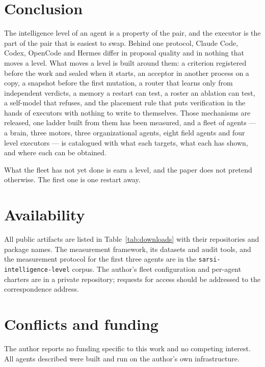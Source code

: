 \documentclass[11pt]{article}
\theoremstyle{definition}
\begin{document}
\section{Conclusion}\label{sec:conclusion}

The intelligence level of an agent is a property of the pair, and the executor is the part of the pair that is easiest to swap. Behind one protocol, Claude Code, Codex, OpenCode and Hermes differ in proposal quality and in nothing that moves a level. What moves a level is built around them: a criterion registered before the work and sealed when it starts, an acceptor in another process on a copy, a snapshot before the first mutation, a router that learns only from independent verdicts, a memory a restart can test, a roster an ablation can test, a self-model that refuses, and the placement rule that puts verification in the hands of executors with nothing to write to themselves. Those mechanisms are released, one ladder built from them has been measured, and a fleet of agents --- a brain, three motors, three organizational agents, eight field agents and four level executors --- is catalogued with what each targets, what each has shown, and where each can be obtained.

What the fleet has not yet done is earn a level, and the paper does not pretend otherwise. The first one is one restart away.

\section*{Availability}

All public artifacts are listed in Table~\ref{tab:downloads} with their repositories and package names. The measurement framework, its datasets and audit tools, and the measurement protocol for the first three agents are in the \texttt{sarsi-intelligence-level} corpus. The author's fleet configuration and per-agent charters are in a private repository; requests for access should be addressed to the correspondence address.

\section*{Conflicts and funding}

The author reports no funding specific to this work and no competing interest. All agents described were built and run on the author's own infrastructure.



\end{document}
